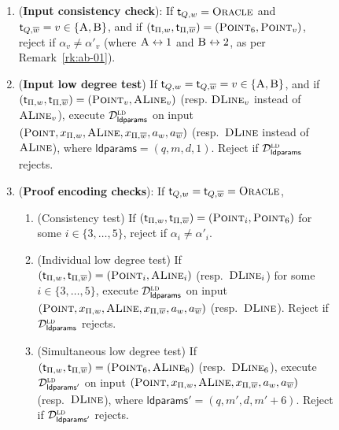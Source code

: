 \documentclass[11pt]{article}
\theoremstyle{definition}
\newcommand{\ol}[1]{\overline{#1}}
\newcommand{\ld}{\textsc{ld}}
\newcommand{\decider}{\mathcal{D}}
\newcommand{\labelstyle}[1]{\ensuremath{\textsc{#1}}\xspace}
\newcommand{\tvarstyle}[1]{\mathsf{#1}}
\newcommand{\tvar}{\ensuremath{\tvarstyle{t}}}
\newcommand{\alice}{\labelstyle{A}}
\newcommand{\bob}{\labelstyle{B}}
\newcommand{\oracle}{\labelstyle{Oracle}}
\newcommand{\typestyle}[1]{\ensuremath{\textsc{#1}}\xspace}
\newcommand{\Point}{\typestyle{Point}}
\newcommand{\ALine}{\typestyle{ALine}}
\newcommand{\DLine}{\typestyle{DLine}}
\newcommand{\ldparams}{\mathsf{ldparams}}
\newenvironment{gamespec}{
  \begin{mdframed}[style=figstyle]}{
  \end{mdframed}}
\begin{document}
\begin{figure}[!htb]
\begin{gamespec}
{\begin{enumerate}
    \item (\textbf{Input consistency check}): If $\tvar_{Q,w} = \oracle$ and
      $\tvar_{Q, \ol{w}} = v \in \{\alice,\bob\}$, and if $(\tvar_{\Pi,w},
      \tvar_{\Pi, \ol{w}}) = (\Point_6, \Point_{v})$, reject if $\alpha_{v} \neq
      \alpha'_{v}$ (where $\alice \leftrightarrow 1$ and $\bob \leftrightarrow
      2$, as per Remark~\ref{rk:ab-01}).
      \label{enu:ar-input-consistency}

    \item (\textbf{Input low degree test}) If $\tvar_{Q,w} = \tvar_{Q,\ol{w}} =
      v \in \{\alice,\bob\}$, and if $(\tvar_{\Pi,w}, \tvar_{\Pi, \ol{w}}) =
      (\Point_{v}, \ALine_{v})$ (resp.
      $\DLine_v$ instead of $\ALine_v$), execute $\decider^\ld_\ldparams$ on
      input $(\Point, x_{\Pi,w} ,\ALine, x_{\Pi,\overline{w}}, a_w, a_{\ol{w}})$
      (resp.\ $\DLine$ instead of $\ALine$), where $\ldparams = (q,m,d,1)$.
      Reject if $\decider^\ld_{\ldparams}$ rejects.
      \label{enu:ar-input-ld}

    \item (\textbf{Proof encoding checks}): If $\tvar_{Q,w} = \tvar_{Q,\ol{w}} =
      \oracle$,
      \begin{enumerate}
			\item (Consistency test) If $(\tvar_{\Pi,w}, \tvar_{\Pi, \ol{w}}) =
        (\Point_i, \Point_6)$ for some $i \in \{3, \dots, 5\}$, reject if
        $\alpha_i \neq \alpha'_i$.
        \label{enu:ar-proof-cons-ld}

      \item (Individual low degree test) If $(\tvar_{\Pi,w}, \tvar_{\Pi,
          \ol{w}}) = (\Point_i, \ALine_i)$ (resp.\ $\DLine_i$) for some $i \in
        \{3, \dots, 5\}$, execute $\decider^\ld_{\ldparams}$ on input $(\Point,
        x_{\Pi,w} ,\ALine,x_{\Pi,\overline{w}}, a_w,a_{\ol{w}})$ (resp.\ $\DLine$).
        Reject if $\decider^\ld_{\ldparams}$ rejects.
        \label{enu:ar-proof-id-ld}

      \item (Simultaneous low degree test) If $(\tvar_{\Pi, w}, \tvar_{\Pi,
          \ol{w}}) = (\Point_6, \ALine_6)$ (resp.\ $\DLine_6$), execute
        $\decider^\ld_{\ldparams'}$ on input $(\Point, x_{\Pi,w}, \ALine,
        x_{\Pi,\overline{w}}, a_w, a_{\ol{w}})$ (resp.\ $\DLine$), where
        $\ldparams'=(q, m', d, m'+6)$.
        Reject if $\decider^\ld_{\ldparams'}$ rejects.
        \label{enu:ar-proof-sim-ld}
      \end{enumerate}
      \label{enu:ar-proof-encoding}


\end{enumerate}}
\end{gamespec}
\end{figure}
\end{document}
